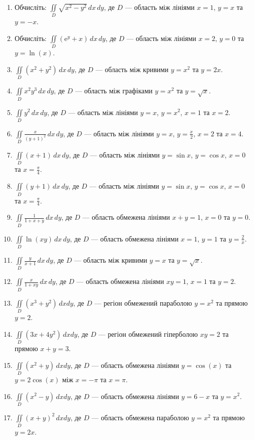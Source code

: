 \begin{enumerate}
\begin{enumerate}[label*=\arabic*.]
  \item Обчисліть: $\iint\limits_D \sqrt{x^{2}-y^{2}}\,dx\,dy$, де $D$ --- область між лініями ${x = 1}$, ${y = x}$ та ${y = -x}$.
  \item Обчисліть: $\iint\limits_D \left({\mathrm e}^{y}+x\right)\,dx\,dy$, де $D$ --- область між лініями ${x = 2}$, ${y = 0}$ та ${y = \ln(x)}$.
  \item ${ \iint\limits_D \left(x^2 + y^2\right) \,dx \,dy }$, де ${ D }$ --- область між кривими ${ y = x^2 }$ та ${ y = 2x }$.
  \item ${ \iint\limits_D x^2y^3 \,dx \,dy }$, де ${ D }$ --- область між графіками ${ y = x^2 }$ та ${ y = \sqrt{x} }$.
  \item ${ \iint\limits_D y^2 \,dx \,dy }$, де ${ D }$ --- область між лініями ${ y = x }$, ${ y = x^2 }$, ${x = 1}$ та ${ x = 2 }$.
  \item ${ \iint\limits_D \frac{x}{\left(y+1\right)^{2}} \,dx \,dy }$, де ${ D }$ --- область між лініями ${ y = x }$, ${ y = \frac{x}{2} }$, ${x = 2}$ та ${ x = 4 }$.
  \item ${ \iint\limits_D (x + 1) \,dx \,dy }$, де ${ D }$ --- область між лініями ${ y = \sin x }$, ${ y = \cos x }$, ${x = 0}$ та ${ x = \frac{\pi}{4} }$.
  \item ${ \iint\limits_D (y + 1) \,dx \,dy }$, де ${ D }$ --- область між лініями ${ y = \sin x }$, ${ y = \cos x }$, ${x = 0}$ та ${ x = \frac{\pi}{4} }$.
  \item ${ \iint\limits_D \frac{1}{1+x+y} \,dx \,dy }$, де ${ D }$ --- область обмежена лініями ${ x + y = 1 }$, ${ x = 0 }$ та ${ y = 0 }$.
  \item ${ \iint\limits_D \ln(xy) \,dx \,dy }$, де ${ D }$ --- область обмежена лініями ${ x = 1 }$, ${ y = 1 }$ та ${ y = \frac{2}{x} }$.
  \item ${ \iint\limits_D \frac{y}{x+1} \,dx \,dy }$, де ${ D }$ --- область між кривими ${ y = x }$ та ${ y = \sqrt{x} }$.
  \item ${ \iint\limits_D \frac{x}{1+xy} \,dx \,dy }$, де ${ D }$ --- область обмежена лініями ${ xy = 1 }$, ${ x = 1 }$ та ${ y = 2 }$.
  \item ${ \iint\limits_D \left(x^{3}+y^{2}\right) \, dxdy }$, де ${ D }$ --- регіон обмежений параболою ${y = x^2}$ та прямою ${y = 2}$.
  \item ${ \iint\limits_D (3x + 4y^2) \, dxdy }$,  де ${ D }$ --- регіон обмежений гіперболою ${xy = 2}$ та прямою ${x + y = 3}$.
  \item ${ \iint\limits_D (x^2 + y) \, dxdy }$, де ${ D }$ --- область обмежена лініями ${y = \cos(x)}$ та ${y = 2\cos(x)}$ між ${x = -\pi}$ та ${x = \pi}$.
  \item ${ \iint\limits_D (x^2 - y) \, dxdy }$, де ${ D }$ --- область обмежена лініями ${y = 6 - x}$ та ${y = x^2}$.
  \item ${ \iint\limits_D \left(x + y\right)^2 \, dxdy }$, де ${ D }$ --- область обмежена параболою $y = x^2$ та прямою $y = 2x$.
\end{enumerate}
\end{enumerate}
